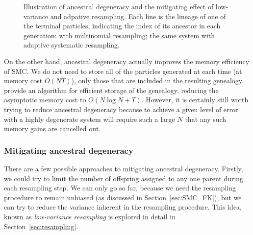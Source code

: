 \begin{figure}[ht]
\centering
{}
\caption[Ancestral degeneracy]{Illustration of ancestral degeneracy and the mitigating effect of low-variance and adpative resampling.
Each line is the lineage of one of the terminal particles, indicating the index of its ancestor in each generation:
 with multinomial resampling;
 the same system with adaptive systematic resampling.}
\label{fig:ancestral_degeneracy}
\end{figure}
On the other hand, ancestral degeneracy actually improves the memory efficiency of SMC. We do not need to store all of the particles generated at each time (at memory cost $O(NT)$), only those that are included in the resulting genealogy. \textcite{jacob2015} provide an algorithm for efficient storage of the genealogy, reducing the asymptotic memory cost to $O(N\log N+T)$.
However, it is certainly still worth trying to reduce ancestral degeneracy because to achieve a given level of error with a highly degenerate system will require such a large $N$ that any such memory gains are cancelled out.


\subsubsection{Mitigating ancestral degeneracy}
There are a few possible approaches to mitigating ancestral degeneracy.
Firstly, we could try to limit the number of offspring assigned to any one parent during each resampling step. We can only go so far, because we need the resampling procedure to remain unbiased (as discussed in Section~\ref{sec:SMC_FK}), but we can try to reduce the variance inherent in the resampling procedure. This idea, known as \emph{low-variance resampling}\seb{[citation?]} is explored in detail in Section~\ref{sec:resampling}.

